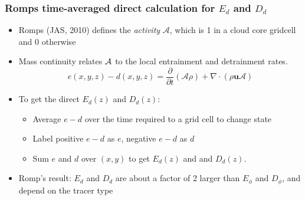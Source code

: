 \documentclass[fleqn,hyperref={colorlinks=true,linkcolor=blue,urlcolor=blue},numbers]{beamer}
\begin{document}
\begin{frame}
  \frametitle{Romps time-averaged direct calculation for $E_d$ and $D_d$}

  \begin{itemize}
  \item Romps (JAS, 2010) defines the \textit{activity} $\mathcal{A}$, which is 1 in a cloud core gridcell
and 0 otherwise \pause
  \item Mass continuity relates ${\cal{A}}$ to the local entrainment and detrainment rates.
\begin{equation*}
  \label{eq:romps_e_minus_d}
  e(x,y,z) - d(x,y,z) = \frac{\partial}{\partial t}(\mathcal{A}\rho) 
        + \nabla \cdot (\rho \mathbf{u} \mathcal{A}) 
\end{equation*}

\pause
\item To get the direct $E_d(z)$ and $D_d(z)$:

  \begin{itemize}
  \item Average $e - d$ over the time required to a grid cell to change state
  \item Label positive  $e-d$  as $e$, negative $e-d$ as  $d$
  \item Sum $e$ and $d$ over $(x,y)$ to get  $E_d(z)$ and and $D_d(z)$.
  \end{itemize} \pause


\item Romp's result:  $E_d$ and $D_d$ are about a factor of 2 larger than
$E_\phi$ and $D_\phi$, and depend on the tracer type

  \end{itemize}


\end{frame}
\end{document}
